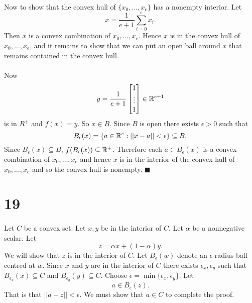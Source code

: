\documentclass[letterpaper,12pt,oneside,onecolumn]{article}
\begin{document}
\paragraph{}
Now to show that the convex hull of $\{x_0, \dots, x_e\}$ has a nonempty interior. Let $$x = \frac{1}{e+1}\sum_{i=0}^e x_i.$$
Then $x$ is a convex combination of $x_0, \dots, x_e$. Hence $x$ is in the convex hull of $x_0, \dots, x_e$, and it remains to show that we can put an open ball around $x$ that remains contained in the convex hull.
\paragraph{}
 Now $$y = \frac{1}{e+1}\begin{bmatrix}1\\ \vdots \\ 1\end{bmatrix} \in \mathbb{R}^{e+1}$$ is in $R^+$ and $f(x) = y$. So $x \in B$. Since $B$ is open there exists $\epsilon >0$ such that $$B_\epsilon(x) = \{a \in \mathbb{R}^e : ||x-a|| < \epsilon\} \subseteq B.$$
Since $B_\epsilon(x) \subseteq B$, $f(B_\epsilon(x)) \subseteq \mathbb{R}^+$. Therefore each $a \in B_\epsilon(x)$ is a convex combination of $x_0, \dots, x_e$ and hence $x$ is in the interior of the convex hull of $x_0, \dots, x_e$ and so the convex hull is nonempty. $\blacksquare$
\section*{19}
\paragraph{}
Let $C$ be a convex set. Let $x,y$ be in the interior of $C$. Let $\alpha$ be a nonnegative scalar. Let $$z = \alpha x + (1-\alpha)y.$$
We will show that $z$ is in the interior of $C$. Let $B_\epsilon(w)$ denote an $\epsilon$ radius ball centred at $w$. Since $x$ and $y$ are in the interior of $C$ there exists $\epsilon_x, \epsilon_y$ such that $B_{\epsilon_x}(x) \subseteq C$ and $B_{\epsilon_y}(y) \subseteq C$. Choose $\epsilon = \min\{\epsilon_x, \epsilon_y\}$. Let $$a \in B_\epsilon(z).$$
That is that $||a-z|| < \epsilon$. We must show that $a \in C$ to complete the proof.
\end{document}
